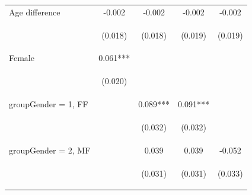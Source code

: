 \documentclass{article} %
\begin{document}
\begin{table}[H]
\begin{center}
\begin{tabular}{lcccc}
Age difference & -0.002 & -0.002 & -0.002 & -0.002 \\
\vspace{4pt} & \begin{footnotesize}(0.018)\end{footnotesize} & \begin{footnotesize}(0.018)\end{footnotesize} & \begin{footnotesize}(0.019)\end{footnotesize} & \begin{footnotesize}(0.019)\end{footnotesize} \\
Female & 0.061*** &  &  &  \\
\vspace{4pt} & \begin{footnotesize}(0.020)\end{footnotesize} & \begin{footnotesize}\end{footnotesize} & \begin{footnotesize}\end{footnotesize} & \begin{footnotesize}\end{footnotesize} \\
groupGender = 1, FF &  & 0.089*** & 0.091*** &  \\
\vspace{4pt} & \begin{footnotesize}\end{footnotesize} & \begin{footnotesize}(0.032)\end{footnotesize} & \begin{footnotesize}(0.032)\end{footnotesize} & \begin{footnotesize}\end{footnotesize} \\
groupGender = 2, MF &  & 0.039 & 0.039 & -0.052 \\
\vspace{4pt} & \begin{footnotesize}\end{footnotesize} & \begin{footnotesize}(0.031)\end{footnotesize} & \begin{footnotesize}(0.031)\end{footnotesize} & \begin{footnotesize}(0.033)\end{footnotesize} \\

\end{tabular}
\end{center}
\end{table}
\end{document}
